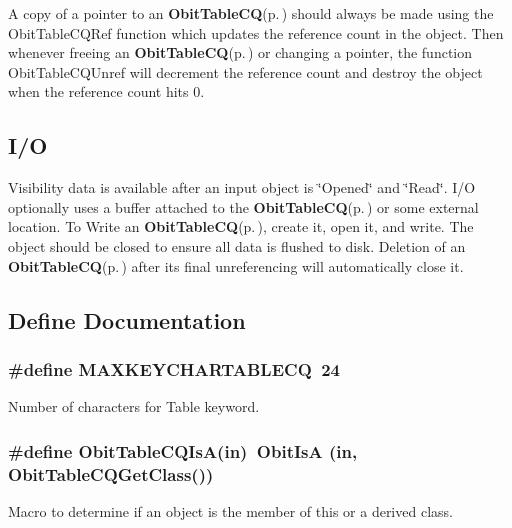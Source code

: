 A copy of a pointer to an {\bf Obit\-Table\-CQ}{\rm (p.\,\pageref{structObitTableCQ})} should always be made using the Obit\-Table\-CQRef function which updates the reference count in the object. Then whenever freeing an {\bf Obit\-Table\-CQ}{\rm (p.\,\pageref{structObitTableCQ})} or changing a pointer, the function Obit\-Table\-CQUnref will decrement the reference count and destroy the object when the reference count hits 0.\subsection{I/O}\label{ObitTableCQ_8h_ObitTableCQUsage}
Visibility data is available after an input object is \char`\"{}Opened\char`\"{} and \char`\"{}Read\char`\"{}. I/O optionally uses a buffer attached to the {\bf Obit\-Table\-CQ}{\rm (p.\,\pageref{structObitTableCQ})} or some external location. To Write an {\bf Obit\-Table\-CQ}{\rm (p.\,\pageref{structObitTableCQ})}, create it, open it, and write. The object should be closed to ensure all data is flushed to disk. Deletion of an {\bf Obit\-Table\-CQ}{\rm (p.\,\pageref{structObitTableCQ})} after its final unreferencing will automatically close it.

\subsection{Define Documentation}
\subsubsection{\setlength{\rightskip}{0pt plus 5cm}\#define MAXKEYCHARTABLECQ\ 24}\label{ObitTableCQ_8h_a0}


Number of characters for Table keyword. 

\subsubsection{\setlength{\rightskip}{0pt plus 5cm}\#define Obit\-Table\-CQIs\-A(in)\ Obit\-Is\-A (in, Obit\-Table\-CQGet\-Class())}\label{ObitTableCQ_8h_a3}


Macro to determine if an object is the member of this or a derived class. 

